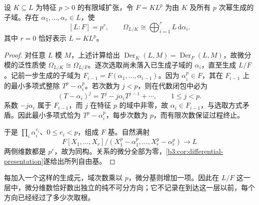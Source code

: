 \begin{lemma}\label{b3:lem:exponent-one-differentials}
	设 \(K\subseteq L\) 为特征 \(p>0\) 的有限域扩张，令 \(F=K L^p\) 为由 \(K\) 及所有 \(p\) 次幂生成的子域。存在 \(\alpha_1,\ldots,\alpha_r\in L\)，使
	\[
		[L:F]=p^r,\qquad \Omega_{L/K}\cong\bigoplus_{i=1}^r L\,\mathrm{d}\alpha_i.
	\]
	其中 \(r=0\) 恰好表示 \(L=K L^p\)。
\end{lemma}
\begin{proof}
	对任意 \(L\) 模 \(M\)，上述计算给出 \(\operatorname{Der}_K(L,M)=\operatorname{Der}_F(L,M)\)，故微分模的泛性质使 \(\Omega_{L/K}\cong\Omega_{L/F}\)。逐次选取尚未落入已生成子域的 \(\alpha_i\)，直至生成 \(L/F\)。记前一步生成的子域为 \(F_{i-1}=F(\alpha_1,\ldots,\alpha_{i-1})\)。因为 \(\alpha_i^p\in F\)，其在 \(F_{i-1}\) 上的最小多项式整除 \(T^p-\alpha_i^p\)。若次数为 \(j<p\)，则在代数闭包中必为
	\[
		(T-\alpha_i)^j=T^j-j\alpha_iT^{j-1}+\cdots, \qquad 1\le j<p.
	\]
	系数 \(-j\alpha_i\) 属于 \(F_{i-1}\)，而 \(j\) 在特征 \(p\) 的域中非零，故 \(\alpha_i\in F_{i-1}\)，与选取方式矛盾。因此最小多项式恰为 \(T^p-\alpha_i^p\)，每步次数为 \(p\)，而有限次数保证过程终止。

	于是 \(\prod_i\alpha_i^{e_i}\)、\(0\le e_i<p\)，组成 \(F\) 基。自然满射
	\[
		F[X_1,\ldots,X_r]/(X_1^p-\alpha_1^p,\ldots,X_r^p-\alpha_r^p) \longrightarrow L
	\]
	两侧维数都是 \(p^r\)，故为同构。关系的微分全部为零，\cref{b3:cor:differential-presentation}遂给出所列自由基。
\end{proof}

每加入一个这样的生成元，域次数乘以 \(p\)，微分基则增加一项。因此在 \(L/F\) 这一层中，微分维数恰好数出独立的纯不可分方向；它不记录在到达这一层以前，每个方向已经经过了多少次取根。

